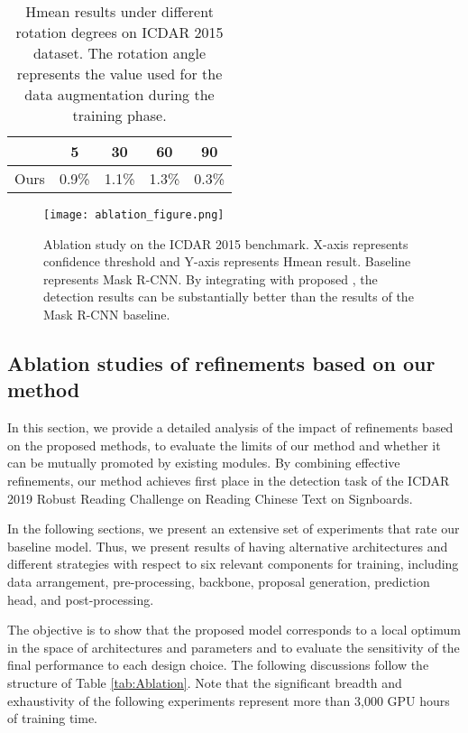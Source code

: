 \begin{table}[!t]
\caption{Hmean results under different rotation degrees on ICDAR 2015 dataset. The rotation angle represents the value used for the data augmentation during the training phase.}
\label{tab:ab1_rd}
\centering
\newcommand{\tabincell}[2]{\begin{tabular}{@{}#1@{}}#2\end{tabular}}
\small
\begin{tabular}{c|c|c|c|c}
  \hline
   & 5 & 30  & 60  & 90 \\
  \hline
  Ours & 0.9\% & 1.1\% & 1.3\% & 0.3\% \\
  \hline
\end{tabular}
\end{table}


\begin{figure}[htb]
  \centering
  \centerline{\texttt{[image: ablation\_figure.png]}}
  \caption{Ablation study on the ICDAR 2015 benchmark. X-axis represents confidence threshold and Y-axis represents Hmean result. Baseline represents Mask R-CNN. By integrating with proposed \Ours, the detection results can be substantially better than the results of the Mask R-CNN baseline.}\label{fig:ablation}
\end{figure}


\subsection{Ablation studies of refinements based on our method}
In this section, we provide a detailed analysis of the impact of refinements based on the proposed methods, to evaluate the limits of our method and whether it can be mutually promoted by existing modules. By combining
effective refinements, our method achieves first place in the detection task of the ICDAR 2019 Robust Reading Challenge on Reading Chinese Text on Signboards. 

In the following sections, we present an extensive set of experiments that rate our baseline model. Thus, we present results of \Ours having alternative architectures and different strategies with respect to six relevant components for training, including data arrangement, pre-processing, backbone, proposal generation, prediction head, and post-processing.


The objective is to show that the proposed model corresponds to a local optimum in the space of architectures and parameters and to evaluate the sensitivity of the final performance to each design choice. The following discussions follow the structure of Table \ref{tab:Ablation}. Note that the significant breadth and exhaustivity of the following experiments represent more than 3,000 GPU hours of training time.

